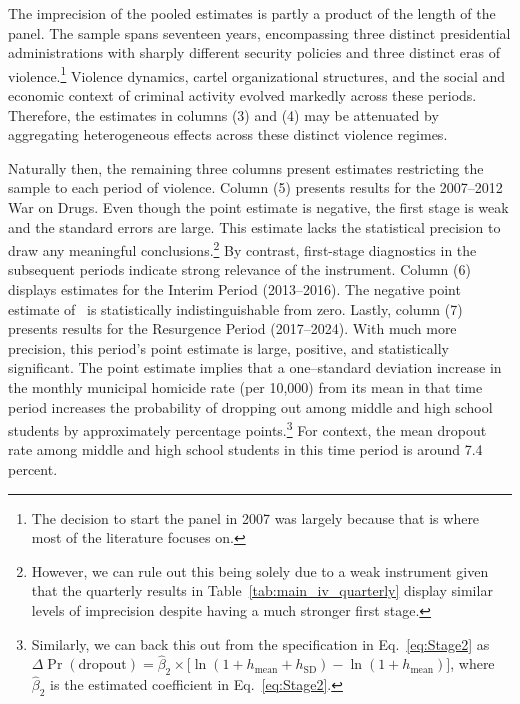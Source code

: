 \documentclass[12pt,letter,english,intoc,bibliography=totoc,index=totoc,BCOR10mm,captions=tableheading,nottitlepage,fleqn]{article}
\theoremstyle{break}
\begin{document}
The imprecision of the pooled estimates is partly a product of the length of the panel. The sample spans seventeen years, encompassing three distinct presidential administrations with sharply different security policies and three distinct eras of violence.\footnote{The decision to start the panel in 2007 was largely because that is where most of the literature focuses on.} Violence dynamics, cartel organizational structures, and the social and economic context of criminal activity evolved markedly across these periods. Therefore, the estimates in columns (3) and (4) may be attenuated by aggregating heterogeneous effects across these distinct violence regimes.

Naturally then, the remaining three columns present estimates restricting the sample to each period of violence. Column (5) presents results for the 2007--2012 War on Drugs. Even though the point estimate is negative, the first stage is weak and the standard errors are large. This estimate lacks the statistical precision to draw any meaningful conclusions.\footnote{However, we can rule out this being solely due to a weak instrument given that the quarterly results in Table~\ref{tab:main_iv_quarterly} display similar levels of imprecision despite having a much stronger first stage.} By contrast, first-stage diagnostics in the subsequent periods indicate strong relevance of the instrument. Column (6) displays estimates for the Interim Period (2013--2016). The negative point estimate of \InterimCoef\ is statistically indistinguishable from zero. Lastly, column (7) presents results for the Resurgence Period (2017--2024). With much more precision, this period's point estimate is large, positive, and statistically significant. The point estimate implies that a one--standard deviation increase in the monthly municipal homicide rate (\MunicipalHRSD per 10,000) from its mean in that time period increases the probability of dropping out among middle and high school students by approximately {} percentage points.\footnote{Similarly, we can back this out from the specification in Eq.~\eqref{eq:Stage2} as $\Delta \Pr(\text{dropout}) = \hat{\beta}_2 \times \bigl[ \ln(1 + h_{\text{mean}} + h_{\text{SD}}) - \ln(1 + h_{\text{mean}}) \bigr]$, where $\hat{\beta}_2$ is the estimated coefficient in Eq.~\eqref{eq:Stage2}.} For context, the mean dropout rate among middle and high school students in this time period is around 7.4 percent.  
\end{document}
